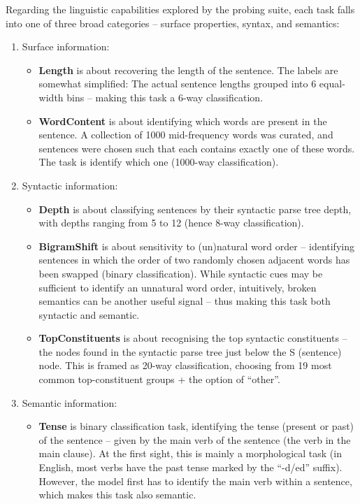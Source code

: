 \documentclass[bsc,frontabs,twoside,singlespacing,parskip,deptreport]{infthesis}
\begin{document}
{{    Regarding the linguistic capabilities explored by the probing suite, each task falls into one of three broad categories -- surface properties, syntax, and semantics:
    \begin{enumerate}
      \item {Surface information:
        \begin{itemize}
          \item \textbf{Length} is about recovering the length of the sentence. The labels are somewhat simplified: The actual sentence lengths grouped into 6 equal-width bins -- making this task a 6-way classification.
          \item \textbf{WordContent} is about identifying which words are present in the sentence. A collection of 1000 mid-frequency words was curated, and sentences were chosen such that each contains exactly one of these words. The task is identify which one (1000-way classification).
        \end{itemize}
      }
      \item{Syntactic information:
        \begin{itemize}
          \item \textbf{Depth} is about classifying sentences by their syntactic parse tree depth, with depths ranging from 5 to 12 (hence 8-way classification).
          \item \textbf{BigramShift} is about sensitivity to (un)natural word order -- identifying sentences in which the order of two randomly chosen adjacent words has been swapped (binary classification). While syntactic cues may be sufficient to identify an unnatural word order, intuitively, broken semantics can be another useful signal -- thus making this task both syntactic and semantic.
          \item \textbf{TopConstituents} is about recognising the top syntactic constituents -- the nodes found in the syntactic parse tree just below the S (sentence) node. This is framed as 20-way classification, choosing from 19 most common top-constituent groups + the option of ``other''.
        \end{itemize}
      }
      \item{Semantic information:
        \begin{itemize}
          \item \textbf{Tense} is binary classification task, identifying the tense (present or past) of the sentence -- given by the main verb of the sentence (the verb in the main clause). At the first sight, this is mainly a morphological task (in English, most verbs have the past tense marked by the ``-d/ed'' suffix). However, the model first has to identify the main verb within a sentence, which makes this task also semantic.

\end{itemize}}
\end{enumerate}}}
\end{document}
